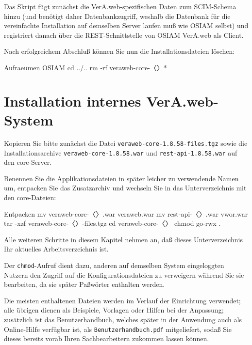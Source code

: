 \documentclass{tarentanleitung}
\newcommand{\vwiaverssw}{1.8.58}
\begin{document}
Das Skript fügt zunächst die VerA.web-spezifischen Daten
zum SCIM-Schema hinzu (und benötigt daher Datenbankzugriff,
weshalb die Datenbank für die vereinfachte Installation
auf demselben Server laufen muß wie OSIAM selbst) und
registriert danach über die REST-Schnittstelle von OSIAM
VerA.web als Client.

\begin{minipage}{\linewidth}
Nach erfolgreichem Abschluß können Sie nun die
Installationsdateien löschen:

\begin{lstdump}{Aufraeumen OSIAM}
cd ../..
rm -rf veraweb-core-〈\lstdumpesc{\vwiaverssw}〉*
\end{lstdump}
\end{minipage}

\section{Installation internes VerA.web-System}\label{sec:setup-int}

Kopieren Sie bitte zunächst die Datei
\texttt{veraweb-core-\vwiaverssw{}-files.tgz} sowie die
Installationsarchive \texttt{veraweb-core-\vwiaverssw{}.war}
und \texttt{rest-api-\vwiaverssw{}.war} auf den core-Server.

\begin{minipage}{\linewidth}
Benennen Sie die Applikationsdateien in später leicher zu
verwendende Namen um, entpacken Sie das Zusatzarchiv und
wechseln Sie in das Unterverzeichnis mit den core-Dateien:

\begin{lstdump}{Entpacken}
mv veraweb-core-〈\lstdumpesc{\vwiaverssw}〉.war veraweb.war
mv rest-api-〈\lstdumpesc{\vwiaverssw}〉.war vwor.war
tar -xzf veraweb-core-〈\lstdumpesc{\vwiaverssw}〉-files.tgz
cd veraweb-core-〈\lstdumpesc{\vwiaverssw}〉
chmod go-rwx .
\end{lstdump}
\end{minipage}

Alle weiteren Schritte in diesem Kapitel nehmen an, daß dieses
Unterverzeichnis Ihr aktuelles Arbeitsverzeichnis ist.

Der \texttt{chmod}-Aufruf dient dazu, anderen auf demselben System
eingeloggten Nutzern den Zugriff auf die Konfigurationsdateien zu
verweigern während Sie sie bearbeiten, da sie später Paßwörter
enthalten werden.

Die meisten enthaltenen Dateien werden im Verlauf der Einrichtung
verwendet; alle übrigen dienen als Beispiele, Vorlagen oder Hilfen
bei der Anpassung; zusätzlich ist das Benutzerhandbuch, welches
später in der Anwendung auch als Online-Hilfe verfügbar ist, als
\texttt{Benutzerhandbuch.pdf} mitgeliefert, sodaß Sie dieses bereits
vorab Ihren Sachbearbeitern zukommen lassen können.
\end{document}
